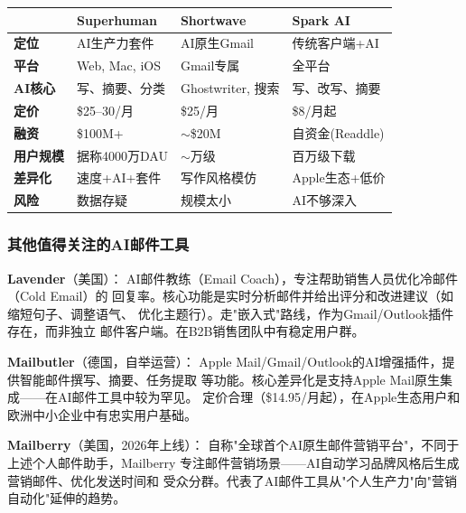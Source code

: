 \begin{keybox}[AI邮件助手对比]
\small
\begin{tabularx}{\textwidth}{l X X X}
\toprule
\rowcolor{figLightGray}
& \textbf{Superhuman} & \textbf{Shortwave} & \textbf{Spark AI} \\
\midrule
\textbf{定位} & AI生产力套件 & AI原生Gmail & 传统客户端+AI \\
\textbf{平台} & Web, Mac, iOS & Gmail专属 & 全平台 \\
\textbf{AI核心} & 写、摘要、分类 & Ghostwriter, 搜索 & 写、改写、摘要 \\
\textbf{定价} & \$25--30/月 & \$25/月 & \$8/月起 \\
\textbf{融资} & \$100M+ & $\sim$\$20M & 自资金(Readdle) \\
\textbf{用户规模} & 据称4000万DAU & $\sim$万级 & 百万级下载 \\
\textbf{差异化} & 速度+AI+套件 & 写作风格模仿 & Apple生态+低价 \\
\textbf{风险} & 数据存疑 & 规模太小 & AI不够深入 \\
\bottomrule
\end{tabularx}
\end{keybox}

\subsubsection{其他值得关注的AI邮件工具}

\textbf{Lavender}（美国）：
AI邮件教练（Email Coach），专注帮助销售人员优化冷邮件（Cold Email）的
回复率。核心功能是实时分析邮件并给出评分和改进建议（如缩短句子、调整语气、
优化主题行）。走"嵌入式"路线，作为Gmail/Outlook插件存在，而非独立
邮件客户端。在B2B销售团队中有稳定用户群。

\textbf{Mailbutler}（德国，自举运营）：
Apple Mail/Gmail/Outlook的AI增强插件，提供智能邮件撰写、摘要、任务提取
等功能。核心差异化是支持Apple Mail原生集成——在AI邮件工具中较为罕见。
定价合理（\$14.95/月起），在Apple生态用户和欧洲中小企业中有忠实用户基础。

\textbf{Mailberry}（美国，2026年上线）：
自称"全球首个AI原生邮件营销平台"，不同于上述个人邮件助手，Mailberry
专注邮件营销场景——AI自动学习品牌风格后生成营销邮件、优化发送时间和
受众分群。代表了AI邮件工具从"个人生产力"向"营销自动化"延伸的趋势。



